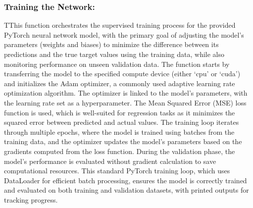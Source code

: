 \documentclass{article}
\begin{document}
\subsubsection{Training the Network:}

TThis function orchestrates the supervised training process for the provided PyTorch neural network model, with the primary goal of adjusting the model’s parameters (weights and biases) to minimize the difference between its predictions and the true target values using the training data, while also monitoring performance on unseen validation data. The function starts by transferring the model to the specified compute device (either ‘cpu’ or ‘cuda’) and initializes the Adam optimizer, a commonly used adaptive learning rate optimization algorithm. The optimizer is linked to the model's parameters, with the learning rate set as a hyperparameter. The Mean Squared Error (MSE) loss function is used, which is well-suited for regression tasks as it minimizes the squared error between predicted and actual values. The training loop iterates through multiple epochs, where the model is trained using batches from the training data, and the optimizer updates the model’s parameters based on the gradients computed from the loss function. During the validation phase, the model’s performance is evaluated without gradient calculation to save computational resources. This standard PyTorch training loop, which uses DataLoader for efficient batch processing, ensures the model is correctly trained and evaluated on both training and validation datasets, with printed outputs for tracking progress.\\
\end{document}
